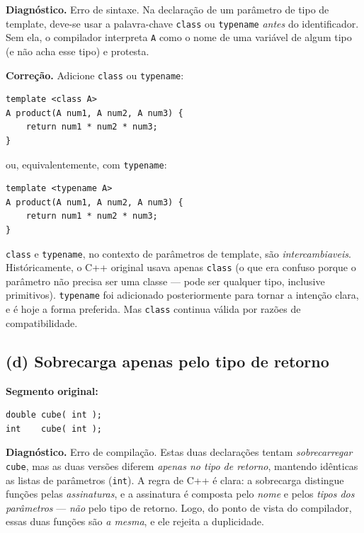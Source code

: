 \documentclass[11pt,a4paper]{article}
\begin{document}
\textbf{Diagn\'ostico.} Erro de sintaxe. Na declara\c{c}\~ao de um par\^ametro de tipo de template, deve-se usar a palavra-chave \texttt{class} ou \texttt{typename} \emph{antes} do identificador. Sem ela, o compilador interpreta \texttt{A} como o nome de uma vari\'avel de algum tipo (e n\~ao acha esse tipo) e protesta.

\textbf{Corre\c{c}\~ao.} Adicione \texttt{class} ou \texttt{typename}:

\begin{lstlisting}[style=cppcode,numbers=none]
template <class A>
A product(A num1, A num2, A num3) {
    return num1 * num2 * num3;
}
\end{lstlisting}

\noindent ou, equivalentemente, com \texttt{typename}:

\begin{lstlisting}[style=cppcode,numbers=none]
template <typename A>
A product(A num1, A num2, A num3) {
    return num1 * num2 * num3;
}
\end{lstlisting}

\begin{obseng}
\texttt{class} e \texttt{typename}, no contexto de par\^ametros de template, s\~ao \emph{intercambiaveis}. Hist\'oricamente, o C++ original usava apenas \texttt{class} (o que era confuso porque o par\^ametro n\~ao precisa ser uma classe --- pode ser qualquer tipo, inclusive primitivos). \texttt{typename} foi adicionado posteriormente para tornar a inten\c{c}\~ao clara, e \'e hoje a forma preferida. Mas \texttt{class} continua v\'alida por raz\~oes de compatibilidade.
\end{obseng}

\subsection*{(d) Sobrecarga apenas pelo tipo de retorno}

\textbf{Segmento original:}
\begin{lstlisting}[style=cppcode,numbers=none]
double cube( int );
int    cube( int );
\end{lstlisting}

\textbf{Diagn\'ostico.} Erro de compila\c{c}\~ao. Estas duas declara\c{c}\~oes tentam \emph{sobrecarregar} \texttt{cube}, mas as duas vers\~oes diferem \emph{apenas no tipo de retorno}, mantendo id\^enticas as listas de par\^ametros (\texttt{int}). A regra de C++ \'e clara: a sobrecarga distingue fun\c{c}\~oes pelas \emph{assinaturas}, e a assinatura \'e composta pelo \emph{nome} e pelos \emph{tipos dos par\^ametros} --- \emph{n\~ao} pelo tipo de retorno. Logo, do ponto de vista do compilador, essas duas fun\c{c}\~oes s\~ao \emph{a mesma}, e ele rejeita a duplicidade.
\end{document}
